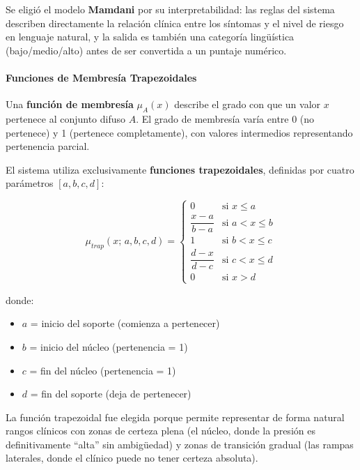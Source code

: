 \documentclass[11pt]{article}
\begin{document}
Se eligi\'o el modelo \textbf{Mamdani} \cite{mamdani1975} por su interpretabilidad: las reglas del sistema describen directamente la relaci\'on cl\'inica entre los s\'intomas y el nivel de riesgo en lenguaje natural, y la salida es tambi\'en una categor\'ia ling\"u\'istica (bajo/medio/alto) antes de ser convertida a un puntaje num\'erico.

\paragraph{Funciones de Membresía Trapezoidales}

Una \textbf{funci\'on de membres\'ia} $\mu_A(x)$ describe el grado con que un valor $x$ pertenece al conjunto difuso $A$. El grado de membres\'ia var\'ia entre 0 (no pertenece) y 1 (pertenece completamente), con valores intermedios representando pertenencia parcial.

El sistema utiliza exclusivamente \textbf{funciones trapezoidales}, definidas por cuatro par\'ametros $[a, b, c, d]$:

\begin{equation}
    \mu_{trap}(x;\, a, b, c, d) =
    \begin{cases}
        0                    & \text{si } x \leq a     \\
        \dfrac{x - a}{b - a} & \text{si } a < x \leq b \\
        1                    & \text{si } b < x \leq c \\
        \dfrac{d - x}{d - c} & \text{si } c < x \leq d \\
        0                    & \text{si } x > d
    \end{cases}
    \label{eq:trapmf}
\end{equation}

donde:
\begin{itemize}
    \item $a$ = inicio del soporte (comienza a pertenecer)
    \item $b$ = inicio del n\'ucleo (pertenencia = 1)
    \item $c$ = fin del n\'ucleo (pertenencia = 1)
    \item $d$ = fin del soporte (deja de pertenecer)
\end{itemize}

La funci\'on trapezoidal fue elegida porque permite representar de forma natural rangos cl\'inicos con zonas de certeza plena (el n\'ucleo, donde la presi\'on es definitivamente ``alta'' sin ambig\"uedad) y zonas de transici\'on gradual (las rampas laterales, donde el cl\'inico puede no tener certeza absoluta).
\end{document}
